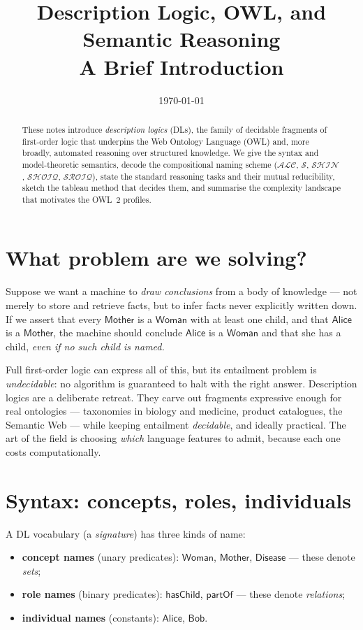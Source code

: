 \documentclass[11pt]{article}
\title{\bfseries Description Logic, OWL, and Semantic Reasoning\\[2pt]
       \large A Brief Introduction}
\author{}
\date{\today}
\newcommand{\concept}[1]{\ensuremath{\mathsf{#1}}}%
\newcommand{\role}[1]{\ensuremath{\mathsf{#1}}}   %
\newcommand{\dl}[1]{\ensuremath{\mathcal{#1}}}%
\theoremstyle{definition}
\begin{document}
\maketitle
\vspace{-2.5em}

\begin{abstract}
\noindent These notes introduce \emph{description logics} (DLs), the family of
decidable fragments of first-order logic that underpins the Web Ontology
Language (OWL) and, more broadly, automated reasoning over structured
knowledge. We give the syntax and model-theoretic semantics, decode the
compositional naming scheme (\dl{ALC}, \dl{S}, \dl{SHIN}, \dl{SHOIQ},
\dl{SROIQ}), state the standard reasoning tasks and their mutual reducibility,
sketch the tableau method that decides them, and summarise the complexity
landscape that motivates the OWL~2 profiles.
\end{abstract}

\section{What problem are we solving?}

Suppose we want a machine to \emph{draw conclusions} from a body of knowledge
--- not merely to store and retrieve facts, but to infer facts never explicitly
written down. If we assert that every \concept{Mother} is a \concept{Woman}
with at least one child, and that \concept{Alice} is a \concept{Mother}, the
machine should conclude \concept{Alice} is a \concept{Woman} and that she has a
child, \emph{even if no such child is named.}

Full first-order logic can express all of this, but its entailment problem is
\emph{undecidable}: no algorithm is guaranteed to halt with the right answer.
Description logics are a deliberate retreat. They carve out fragments
expressive enough for real ontologies --- taxonomies in biology and medicine,
product catalogues, the Semantic Web --- while keeping entailment
\emph{decidable}, and ideally practical. The art of the field is choosing
\emph{which} language features to admit, because each one costs computationally.

\section{Syntax: concepts, roles, individuals}

A DL vocabulary (a \emph{signature}) has three kinds of name:
\begin{itemize}[nosep]
  \item \textbf{concept names} (unary predicates): \concept{Woman},
        \concept{Mother}, \concept{Disease} --- these denote \emph{sets};
  \item \textbf{role names} (binary predicates): \role{hasChild},
        \role{partOf} --- these denote \emph{relations};
  \item \textbf{individual names} (constants): \concept{Alice}, \concept{Bob}.
\end{itemize}
\end{document}
